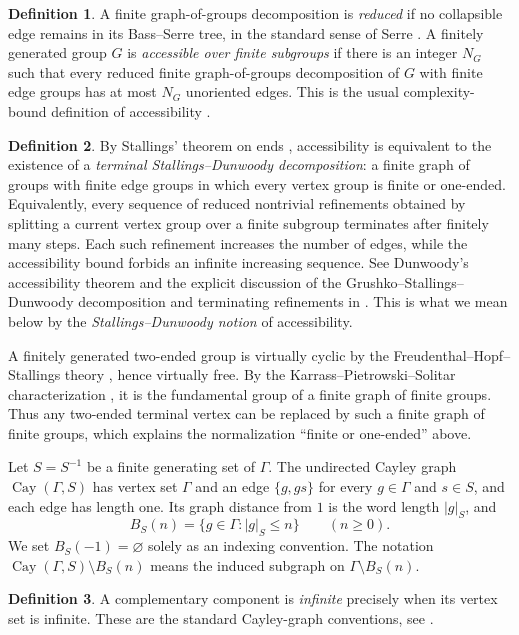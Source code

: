 \documentclass[11pt]{article}
\theoremstyle{definition}
\newtheorem*{definition*}{Definition}
\newcommand{\Cay}{\operatorname{Cay}}
\begin{document}
\begin{definition*}
A finite graph-of-groups decomposition is \emph{reduced} if no collapsible edge remains in
its Bass--Serre tree, in the standard sense of Serre
\cite[Chapter~I, Section~5.4]{Serre2003}.  A finitely generated group $G$ is
\emph{accessible over finite subgroups} if there is an integer $N_G$ such that every reduced
finite graph-of-groups decomposition of $G$ with finite edge groups has at most $N_G$
unoriented edges.  This is the usual complexity-bound definition of accessibility
\cite[Introduction, pp.~1805--1806]{LouderTouikan2017}.
\end{definition*}

\begin{definition*}
By Stallings' theorem on ends
\cite[Chapter~5]{Stallings1971}, accessibility is equivalent to the existence of a
\emph{terminal Stallings--Dunwoody decomposition}: a finite graph of groups with finite edge
groups in which every vertex group is finite or one-ended.  Equivalently, every sequence of
reduced nontrivial refinements obtained by splitting a current vertex group over a finite
subgroup terminates after finitely many steps. Each such refinement increases the number of
edges, while the accessibility bound forbids an infinite increasing sequence.  See
Dunwoody's accessibility theorem \cite{Dunwoody1985} and the explicit discussion of the
Grushko--Stallings--Dunwoody decomposition and terminating refinements in
\cite[Introduction, pp.~1805--1807]{LouderTouikan2017}.  This is what we mean below by the
\emph{Stallings--Dunwoody notion} of accessibility.
\end{definition*}
A finitely generated two-ended group is virtually cyclic by the Freudenthal--Hopf--Stallings
theory \cite[Chapter~5]{Stallings1971}, hence virtually free.  By the
Karrass--Pietrowski--Solitar characterization
\cite[Theorem~1]{KarrassPietrowskiSolitar1973}, it is the fundamental group of a finite graph
of finite groups.  Thus any two-ended terminal vertex can be replaced by such a finite graph
of finite groups, which explains the normalization ``finite or one-ended'' above.

Let $S=S^{-1}$ be a finite generating set of $\Gamma$.  The undirected Cayley graph
$\Cay(\Gamma,S)$ has vertex set $\Gamma$ and an edge $\{g,gs\}$ for every
$g\in\Gamma$ and $s\in S$, and each edge has length one.  Its graph distance from $1$ is the
word length $|g|_S$, and
\[
 B_S(n)=\{g\in\Gamma:|g|_S\le n\}\qquad(n\ge0).
\]
We set $B_S(-1)=\varnothing$ solely as an indexing convention.  The notation
$\Cay(\Gamma,S)\setminus B_S(n)$ means the induced subgraph on
$\Gamma\setminus B_S(n)$.  
\begin{definition*}
A complementary component is \emph{infinite} precisely when its
vertex set is infinite.  These are the standard Cayley-graph conventions, see
\cite[Chapter~I.8]{BridsonHaefliger1999}.
\end{definition*}
\end{document}
